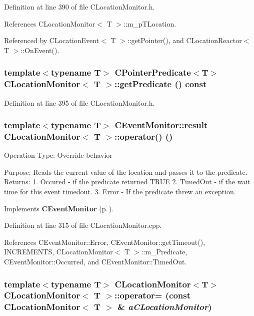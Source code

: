 Definition at line 390 of file CLocation\-Monitor.h.

References CLocation\-Monitor$<$ T $>$::m\_\-p\-TLocation.

Referenced by CLocation\-Event$<$ T $>$::get\-Pointer(), and CLocation\-Reactor$<$ T $>$::On\-Event().
\subsubsection{\setlength{\rightskip}{0pt plus 5cm}template$<$typename T$>$ {\bf CPointer\-Predicate}$<$T$>$ CLocation\-Monitor$<$ T $>$::get\-Predicate () const\hspace{0.3cm}{\tt  [inline]}}\label{classCLocationMonitor_a6}




Definition at line 395 of file CLocation\-Monitor.h.
\subsubsection{\setlength{\rightskip}{0pt plus 5cm}template$<$typename T$>$ {\bf CEvent\-Monitor::result} CLocation\-Monitor$<$ T $>$::operator() ()\hspace{0.3cm}{\tt  [virtual]}}\label{classCLocationMonitor_a7}


Operation Type: Override behavior

Purpose: Reads the current value of the location and passes it to the predicate. Returns: 1. Occured - if the predicate returned TRUE 2. Timed\-Out - if the wait time for this event timedout. 3. Error - If the predicate threw an exception. 

Implements {\bf CEvent\-Monitor} {\rm (p.\,\pageref{classCEventMonitor_a7})}.

Definition at line 315 of file CLocation\-Monitor.cpp.

References CEvent\-Monitor::Error, CEvent\-Monitor::get\-Timeout(), INCREMENTS, CLocation\-Monitor$<$ T $>$::m\_\-Predicate, CEvent\-Monitor::Occurred, and CEvent\-Monitor::Timed\-Out.
\subsubsection{\setlength{\rightskip}{0pt plus 5cm}template$<$typename T$>$ CLocation\-Monitor$<$T$>$ CLocation\-Monitor$<$ T $>$::operator= (const CLocation\-Monitor$<$ T $>$ \& {\em a\-CLocation\-Monitor})\hspace{0.3cm}{\tt  [private]}}\label{classCLocationMonitor_c1}


